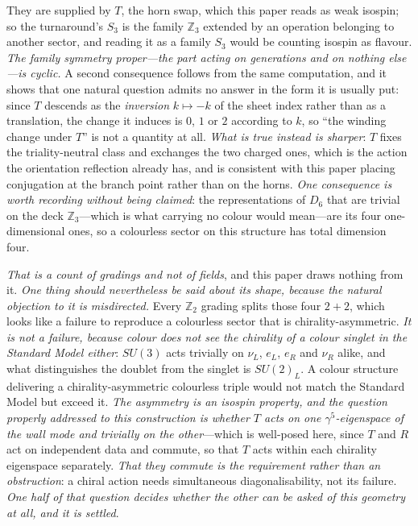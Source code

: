 \documentclass[11pt]{article}
\begin{document}
They are supplied by $T$, the horn swap, which this paper reads as weak isospin; so the turnaround's $S_3$ is
the family $\mathbb{Z}_3$ extended by an operation belonging to another sector, and reading it as a family
$S_3$ would be counting isospin as flavour. \emph{The family symmetry proper---the part acting on generations
and on nothing else---is cyclic.} A second consequence follows from the same computation, and it shows that
one natural question admits no answer in the form it is usually put: since $T$ descends as the
\emph{inversion} $k\mapsto-k$ of the sheet index rather than as a translation, the change it induces is $0$,
$1$ or $2$ according to $k$, so ``the winding change under $T$'' is not a quantity at all. \emph{What is true
instead is sharper}: $T$ fixes the triality-neutral class and exchanges the two charged ones, which is the
action the orientation reflection already has, and is consistent with
this paper placing conjugation at the branch point rather than on the horns. \emph{One consequence is worth recording without being
claimed}: the representations of $D_{6}$ that are trivial on the deck $\mathbb{Z}_{3}$---which is what carrying
no colour would mean---are its four one-dimensional ones, so a colourless sector on this structure has total
dimension four. 

\emph{That is a count of gradings and not of fields}, and this paper draws nothing from it. \emph{One thing should nevertheless be said about its shape, because the natural objection to it is misdirected.} Every $\mathbb{Z}_2$ grading splits those four $2+2$, which looks like a failure to reproduce a colourless sector that is chirality-asymmetric. \emph{It is not a failure, because colour does not see the chirality of a colour singlet in the Standard Model either}: $SU(3)$ acts trivially on $\nu_L$, $e_L$, $e_R$ and $\nu_R$ alike, and what distinguishes the doublet from the singlet is $SU(2)_L$. A colour structure delivering a chirality-asymmetric colourless triple would not match the Standard Model but exceed it. \emph{The asymmetry is an isospin property, and the question properly addressed to this construction is whether $T$ acts on one $\gamma^{5}$-eigenspace of the wall mode and trivially on the other}---which is well-posed here, since $T$ and $R$ act on independent data and commute, so that $T$ acts within each chirality eigenspace separately. \emph{That they commute is the requirement rather than an obstruction}: a chiral action needs simultaneous diagonalisability, not its failure. \emph{One half of that question decides whether the other can be asked of this geometry at all, and it is settled}. 
\end{document}
